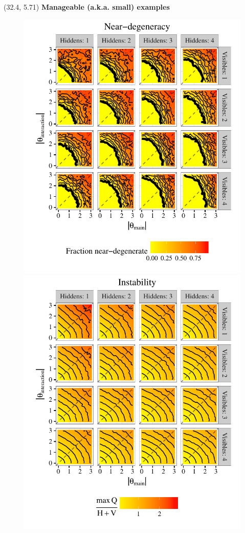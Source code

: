 \documentclass[extrafontsizes, 30pt]{memoir}
\begin{document}
\begin{textblock}{14}(32.4, 5.71)
{\large \bfseries Manageable (a.k.a. small) examples}
\begin{figure}
\centering
\includegraphics{images/degeneracy.pdf}
\includegraphics{images/instability.pdf}

\end{figure}
\end{textblock}
\end{document}
